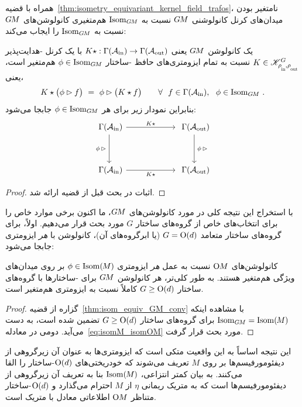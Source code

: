 همراه با قضیه~\ref{thm:isometry_equivariant_kernel_field_trafos}، نامتغیر بودن میدان‌های کرنل کانولوشنی $G\mkern-1.4muM$ نسبت به $\operatorname{Isom}_{G\mkern-1.4muM}$ هم‌متغیری کانولوشن‌های $G\mkern-1.4muM$ نسبت به $\operatorname{Isom}_{G\mkern-1.4muM}$ را ایجاب می‌کند:
\begin{thm}
\label{thm:isom_equiv_GM_conv}
    یک کانولوشن $G\mkern-1.4muM$ یعنی $K\star: \Gamma(\mathcal{A}_\textup{in})\to \Gamma(\mathcal{A}_\textup{out})$ با یک کرنل -هدایت‌پذیر $K\in\KG$ نسبت به تمام ایزومتری‌های حافظ -ساختار $\phi \in \operatorname{Isom}_{G\mkern-1.4muM}$ هم‌متغیر است، یعنی،
    \begin{align}
        K \star \big( \phi \rhd f \big) \ =\ 
        \phi \rhd \big( K \star  f \big)
        \qquad \forall\ \ f\in\Gamma(\Ain), \ \ \phi\in \IsomGM \,.
    \end{align}
    بنابراین نمودار زیر برای هر $\phi \in \operatorname{Isom}_{G\mkern-1.4muM}$ جابجا می‌شود:
    \begin{equation}
    \begin{tikzcd}[column sep=60pt, row sep=35, font=\normalsize]
        \Gamma(\Ain)
            \arrow[r, "K\star"]
            \arrow[d, "\phi\,\rhd\,"']
        &
        \Gamma(\Aout)
            \arrow[d, "\,\phi\,\rhd"]
        \\
        \Gamma(\Ain)
            \arrow[r, "K\star"']
        &
        \Gamma(\Aout)
    \end{tikzcd}
    \end{equation}
\end{thm}
\begin{proof}
    اثبات در بحث قبل از قضیه ارائه شد.
\end{proof}



با استخراج این نتیجه کلی در مورد کانولوشن‌های $G\mkern-1.4muM$، ما اکنون برخی موارد خاص را برای انتخاب‌های خاص از گروه‌های ساختار $G$ مورد بحث قرار می‌دهیم.
اولاً، برای گروه‌های ساختار متعامد $G=\operatorname{O}(d)$ (یا ابرگروه‌های آن)، کانولوشن با \emph{هر} ایزومتری جابجا می‌شود:
\begin{thm}
\label{thm:Od_equiv_OM_conv}
    کانولوشن‌های $\operatorname{O}\mkern-3.6muM$ نسبت به عمل \emph{هر} ایزومتری $\phi \in \operatorname{Isom}(\mkern-1.5mu M \mkern-.5mu)$ بر روی میدان‌های ویژگی هم‌متغیر هستند.
    به طور کلی‌تر، هر کانولوشن $G\mkern-1.4muM$ برای \lr{G}-ساختارها با گروه‌های ساختار $G\geq\operatorname{O}(d)$ کاملاً نسبت به ایزومتری هم‌متغیر است.
\end{thm}
\begin{proof}
    گزاره از قضیه~\eqref{thm:isom_equiv_GM_conv} با مشاهده اینکه $\operatorname{Isom}_{G\mkern-1.4muM} = \operatorname{Isom}(\mkern-1.5mu M \mkern-.5mu)$ برای گروه‌های ساختار $G \geq \operatorname{O}(d)$ تضمین شده است، به دست می‌آید.
    دومی در معادله~\eqref{eq:isomM_isomOM} مورد بحث قرار گرفت.
\end{proof}
این نتیجه اساساً به این واقعیت متکی است که ایزومتری‌ها به عنوان آن زیرگروهی از دیفئومورفیسم‌ها بر روی $M$ تعریف می‌شوند که خودریختی‌های $\operatorname{O}(d)$-ساختار را القا می‌کنند.
به بیان کمتر انتزاعی، $\operatorname{Isom}(\mkern-1.5mu M \mkern-.5mu)$ بنا به تعریف آن زیرگروهی از دیفئومورفیسم‌ها است که به متریک ریمانی $\eta$ از $M$ احترام می‌گذارد و $\operatorname{O}(d)$-ساختار متناظر $\operatorname{O}\mkern-3.6muM$ اطلاعاتی معادل با متریک است.


